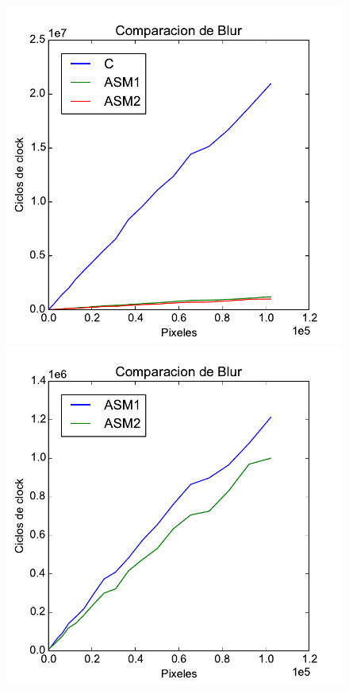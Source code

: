 \begin{figure}[h!]
	\centering
	\includegraphics[scale=0.5]{images/c_asm1_asm2_blur_comp}
	\includegraphics[scale=0.5]{images/asm1_asm2_blur_comp}
\end{figure}

